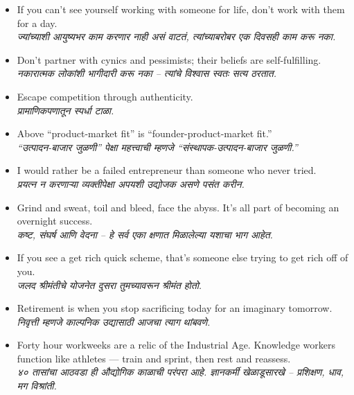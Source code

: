 \begin{itemize}
  \item If you can’t see yourself working with someone for life, don’t work with them for a day. \\
  \textit{ज्यांच्याशी आयुष्यभर काम करणार नाही असं वाटतं, त्यांच्याबरोबर एक दिवसही काम करू नका.}

  \item Don’t partner with cynics and pessimists; their beliefs are self-fulfilling. \\
  \textit{नकारात्मक लोकांशी भागीदारी करू नका – त्यांचे विश्वास स्वतः सत्य ठरतात.}

  \item Escape competition through authenticity. \\
  \textit{प्रामाणिकपणातून स्पर्धा टाळा.}

  \item Above ``product-market fit'' is ``founder-product-market fit.'' \\
  \textit{``उत्पादन-बाजार जुळणी'' पेक्षा महत्त्वाची म्हणजे ``संस्थापक-उत्पादन-बाजार जुळणी.''}

  \item I would rather be a failed entrepreneur than someone who never tried. \\
  \textit{प्रयत्न न करणाऱ्या व्यक्तीपेक्षा अपयशी उद्योजक असणे पसंत करीन.}

  \item Grind and sweat, toil and bleed, face the abyss. It’s all part of becoming an overnight success. \\
  \textit{कष्ट, संघर्ष आणि वेदना – हे सर्व एका क्षणात मिळालेल्या यशाचा भाग आहेत.}

  \item If you see a get rich quick scheme, that’s someone else trying to get rich off of you. \\
  \textit{जलद श्रीमंतीचे योजनेत दुसरा तुमच्यावरून श्रीमंत होतो.}

  \item Retirement is when you stop sacrificing today for an imaginary tomorrow. \\
  \textit{निवृत्ती म्हणजे काल्पनिक उद्यासाठी आजचा त्याग थांबवणे.}

  \item Forty hour workweeks are a relic of the Industrial Age. Knowledge workers function like athletes — train and sprint, then rest and reassess. \\
  \textit{४० तासांचा आठवडा ही औद्योगिक काळाची परंपरा आहे. ज्ञानकर्मी खेळाडूसारखे – प्रशिक्षण, धाव, मग विश्रांती.}
\end{itemize}

